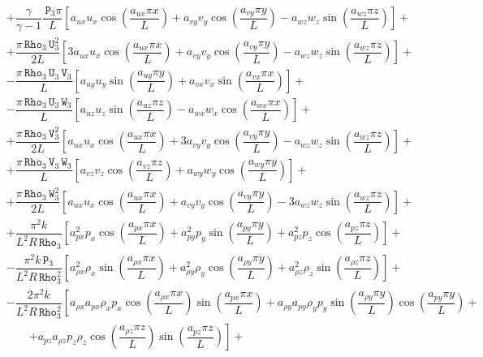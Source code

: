 \documentclass[10pt]{article}
\newcommand{\Rho}{\,\mathtt{Rho}}
\newcommand{\PP}{\,\mathtt{P}}
\newcommand{\U}{\,\mathtt{U}}
\newcommand{\V}{\,\mathtt{V}}
\newcommand{\W}{\,\mathtt{W}}
\begin{document}
\begin{equation*}
 \begin{split}
&+ \dfrac{\gamma}{\gamma-1}\dfrac{\PP_3 \pi}{L}\left[a_{ux} u_x \cos\left(\dfrac{a_{ux} \pi x}{L}\right)+a_{vy} v_y \cos\left(\dfrac{a_{vy} \pi y}{L}\right)-a_{wz} w_z \sin\left(\dfrac{a_{wz} \pi z}{L}\right)\right] +\\
&+\dfrac{\pi \Rho_3 \U_3^2}{2L}\left[3 a_{ux} u_x \cos\left(\dfrac{a_{ux} \pi x}{L}\right)+a_{vy} v_y \cos\left(\dfrac{a_{vy} \pi y}{L}\right)-a_{wz} w_z \sin\left(\dfrac{a_{wz} \pi z}{L}\right)\right]+\\
&-\dfrac{\pi \Rho_3 \U_3 \V_3}{L}\left[a_{uy} u_y \sin\left(\dfrac{a_{uy} \pi y}{L}\right)+a_{vx} v_x \sin\left(\dfrac{a_{vx} \pi x}{L}\right)\right] +\\
&-\dfrac{\pi \Rho_3 \U_3 \W_3}{L}\left[a_{uz} u_z \sin\left(\dfrac{a_{uz} \pi z}{L}\right)-a_{wx} w_x \cos\left(\dfrac{a_{wx} \pi x}{L}\right)\right] +\\
&+\dfrac{\pi \Rho_3 \V_3^2}{2L}\left[a_{ux} u_x \cos\left(\dfrac{a_{ux} \pi x}{L}\right)+3 a_{vy} v_y \cos\left(\dfrac{a_{vy} \pi y}{L}\right)-a_{wz} w_z \sin\left(\dfrac{a_{wz} \pi z}{L}\right)\right] +\\
&+ \dfrac{\pi \Rho_3 \V_3 \W_3}{L}\left[a_{vz} v_z \cos\left(\dfrac{a_{vz} \pi z}{L}\right)+a_{wy} w_y \cos\left(\dfrac{a_{wy} \pi y}{L}\right)\right]+\\
&+\dfrac{\pi \Rho_3 \W_3^2}{2L}\left[a_{ux} u_x \cos\left(\dfrac{a_{ux} \pi x}{L}\right)+a_{vy} v_y \cos\left(\dfrac{a_{vy} \pi y}{L}\right)-3 a_{wz} w_z \sin\left(\dfrac{a_{wz} \pi z}{L}\right)\right]+\\
&+\dfrac{ \pi^2 k}{L^2 R \Rho_3}\left[a_{px}^2 p_x \cos\left(\dfrac{a_{px} \pi x}{L}\right)+a_{py}^2 p_y \sin\left(\dfrac{a_{py} \pi y}{L}\right)+a_{pz}^2 p_z \cos\left(\dfrac{a_{pz} \pi z}{L}\right)\right] +\\
&-\dfrac{ \pi^2 k \PP_3}{L^2 R \Rho_3^2}\left[a_{\rho x}^2 \rho_x \sin\left(\dfrac{a_{\rho x} \pi x}{L}\right)+a_{\rho y}^2 \rho_y \cos\left(\dfrac{a_{\rho y} \pi y}{L}\right)+a_{\rho z}^2 \rho_z \sin\left(\dfrac{a_{\rho z} \pi z}{L}\right)\right] +\\
&- \dfrac{2 \pi^2 k}{L^2 R \Rho_3^2}\left[a_{\rho x} a_{px} \rho_x p_x \cos\left(\dfrac{a_{\rho x} \pi x}{L}\right) \sin\left(\dfrac{a_{px} \pi x}{L}\right)+a_{\rho y} a_{py} \rho_y p_y \sin\left(\dfrac{a_{\rho y} \pi y}{L}\right) \cos\left(\dfrac{a_{py} \pi y}{L}\right)\right.+\\
    &\qquad\left.+a_{pz} a_{\rho z} p_z \rho_z \cos\left(\dfrac{a_{\rho z} \pi z}{L}\right) \sin\left(\dfrac{a_{pz} \pi z}{L}\right)\right] +\\

\end{split}
\end{equation*}
\end{document}
